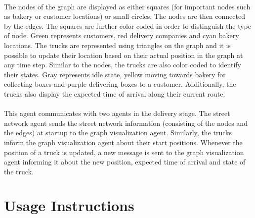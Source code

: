 \documentclass[11pt, a4paper]{article}
\begin{document}
\paragraph{}
The nodes of the graph are displayed as either squares (for important nodes such as bakery or customer locations) or small circles. The nodes are then connected by the edges. The squares are further color coded in order to distinguish the type of node. Green represents customers, red delivery companies and cyan bakery locations. The trucks are represented using triangles on the graph and it is possible to update their location based on their actual position in the graph at any time step. Similar to the nodes, the trucks are also color coded to identify their states. Gray represents idle state, yellow moving towards bakery for collecting boxes and purple delivering boxes to a customer. Additionally, the trucks also display the expected time of arrival along their current route.

\paragraph{}
This agent communicates with two agents in the delivery stage. The street network agent sends the street network information (consisting of the nodes and the edges) at startup to the graph visualization agent. Similarly, the trucks inform the graph visualization agent about their start positions. Whenever the position of a truck is updated, a new message is sent to the graph visualization agent informing it about the new position, expected time of arrival and state of the truck.

\section{Usage Instructions}
\end{document}
